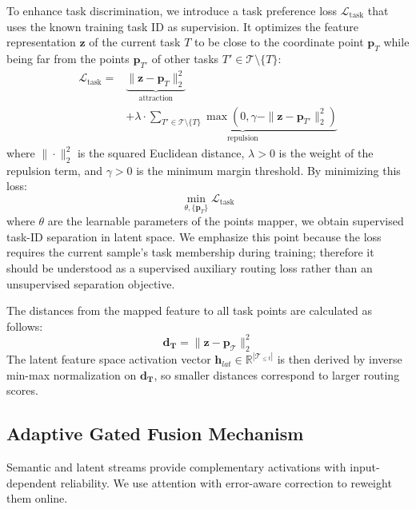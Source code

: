 \documentclass[11pt]{article}
\begin{document}
To enhance task discrimination, we introduce a task preference loss $\mathcal{L}_{\text{task}}$ that uses the known training task ID as supervision. It optimizes the feature representation $\mathbf{z}$ of the current task $T$ to be close to the coordinate point $\mathbf{p}_T$ while being far from the points $\mathbf{p}_{T'}$ of other tasks $T' \in \mathcal{T} \setminus \{T\}$:
\begin{equation}
\begin{split}
\mathcal{L}_{\text{task}} = 
& \underbrace{\|\mathbf{z} - \mathbf{p}_T\|_2^2}_{\text{attraction}} \\
& + \lambda \cdot \underbrace{\sum_{T' \in \mathcal{T} \setminus \{T\}} \max(0, \gamma - \|\mathbf{z} - \mathbf{p}_{T'}\|_2^2)}_{\text{repulsion}}
\end{split}
\label{eq:task-loss}
\end{equation}
where $\|\cdot\|_2^2$ is the squared Euclidean distance, $\lambda > 0$ is the weight of the repulsion term, and $\gamma > 0$ is the minimum margin threshold. By minimizing this loss:
\begin{equation}
\min_{\theta,\{\mathbf{p}_T\}} \mathcal{L}_{\text{task}}
\end{equation}
where $\theta$ are the learnable parameters of the points mapper, we obtain supervised task-ID separation in latent space. We emphasize this point because the loss requires the current sample's task membership during training; therefore it should be understood as a supervised auxiliary routing loss rather than an unsupervised separation objective.

The distances from the mapped feature to all task points are calculated as follows:
\begin{equation}
    \mathbf{d_{T}} = \|\mathbf{z} - \mathbf{p}_{\mathcal{T}}\|_2^2
\end{equation}
The latent feature space activation vector $\mathbf{h}_{lat} \in \mathbb{R}^{|\mathcal{T}_{\le t}|}$ is then derived by inverse min-max normalization on $\mathbf{d_{T}}$, so smaller distances correspond to larger routing scores.

\subsection{Adaptive Gated Fusion Mechanism}




Semantic and latent streams provide complementary activations with input-dependent reliability. We use attention with error-aware correction to reweight them online.
\end{document}
